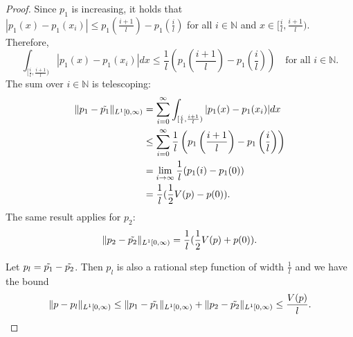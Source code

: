 \documentclass[10pt,a4paper]{amsart}
\begin{document}
\begin{proof}
    Since $p_1$ is increasing, it holds that $|p_1(x)-p_1(x_i)|\leq p_1(\frac{i+1}{l})-p_1(\frac{i}{l})$ for all $i\in\mathbb{N}$ and $x\in[\frac{i}{l},\frac{i+1}{l})$. Therefore,
    \begin{equation*}
        \int_{[\frac{i}{l},\frac{i+1}{l})}|p_1(x)-p_1(x_i)|dx\leq \frac{1}{l}\left(p_1\left(\frac{i+1}{l}\right)-p_1\left(\frac{i}{l}\right)\right)\quad\text{for all $i\in\mathbb{N}$.}
    \end{equation*}
    The sum over $i\in\mathbb{N}$ is telescoping:
    \begin{align*}
        \lVert p_1-\Tilde{p_1}\rVert_{ L^1[0,\infty)} &= \sum_{i=0}^\infty\int_{[\frac{i}{l},\frac{i+1}{l})}|p_1(x)-p_1(x_i)|dx\\
        &\leq\sum_{i=0}^\infty\frac{1}{l}\left(p_1\left(\frac{i+1}{l}\right)-p_1\left(\frac{i}{l}\right)\right)\\
        &=\lim_{i\rightarrow\infty}\frac{1}{l}(p_1(i)-p_1(0))\\
        &= \frac{1}{l}(\frac{1}{2}V(p)-p(0)).
    \end{align*}
    The same result applies for $p_2$:
    \begin{equation*}
        \lVert p_2-\Tilde{p_2}\rVert_{ L^1[0,\infty)}= \frac{1}{l}(\frac{1}{2}V(p)+p(0)).
    \end{equation*}

    Let $p_l = \Tilde{p_1} - \Tilde{p_2}$. Then $p_l$ is also a rational step function of width $\frac{1}{l}$ and we have the bound
    \begin{equation*}
        \lVert p-p_l\rVert_{ L^1[0,\infty)} \leq \lVert p_1-\Tilde{p_1}\rVert_{ L^1[0,\infty)} + \lVert p_2-\Tilde{p_2}\rVert_{ L^1[0,\infty)} \leq \frac{V(p)}{l}.
    \end{equation*}
\end{proof}
\end{document}
